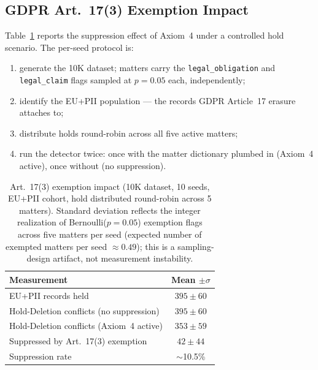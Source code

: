 \documentclass{ieeeaccess}
\begin{document}
\subsection{GDPR Art.~17(3) Exemption Impact}
\label{sec:exemption}

Table~\ref{tab:exemption} reports the suppression effect of Axiom~4 under a controlled hold scenario. The per-seed protocol is:
\begin{enumerate}
    \item generate the 10K dataset; matters carry the \texttt{legal\_obligation} and \texttt{legal\_claim} flags sampled at $p{=}0.05$ each, independently;
    \item identify the EU+PII population --- the records GDPR Article~17 erasure attaches to;
    \item distribute holds round-robin across all five active matters;
    \item run the detector twice: once with the matter dictionary plumbed in (Axiom~4 active), once without (no suppression).
\end{enumerate}

\begin{table}[t]
\centering
\caption{Art.~17(3) exemption impact (10K dataset, 10 seeds, EU+PII cohort, hold distributed round-robin across 5 matters). Standard deviation reflects the integer realization of Bernoulli($p{=}0.05$) exemption flags across five matters per seed (expected number of exempted matters per seed $\approx 0.49$); this is a sampling-design artifact, not measurement instability.}
\label{tab:exemption}
\begin{tabular}{lc}
\hline\hline
Measurement & Mean $\pm \sigma$ \\
\hline
EU+PII records held                              & $395 \pm 60$ \\
Hold-Deletion conflicts (no suppression)         & $395 \pm 60$ \\
Hold-Deletion conflicts (Axiom~4 active)         & $353 \pm 59$ \\
Suppressed by Art.~17(3) exemption               & $42 \pm 44$  \\
Suppression rate                                 & $\sim$10.5\%    \\
\hline\hline
\end{tabular}
\end{table}
\end{document}
